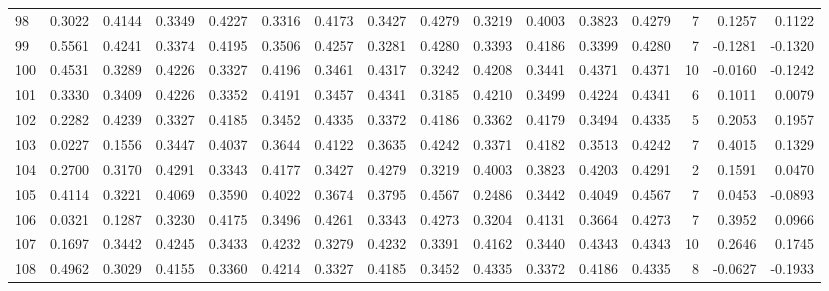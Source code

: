 \begin{tabular}{lrrrrrrrrrrrrrrr}
98  &      0.3022 &  0.4144 &  0.3349 &  0.4227 &  0.3316 &  0.4173 &  0.3427 &  0.4279 &  0.3219 &  0.4003 &   0.3823 &     0.4279 &      7 &                    0.1257 &                     0.1122 \\
99  &      0.5561 &  0.4241 &  0.3374 &  0.4195 &  0.3506 &  0.4257 &  0.3281 &  0.4280 &  0.3393 &  0.4186 &   0.3399 &     0.4280 &      7 &                   -0.1281 &                    -0.1320 \\
100 &      0.4531 &  0.3289 &  0.4226 &  0.3327 &  0.4196 &  0.3461 &  0.4317 &  0.3242 &  0.4208 &  0.3441 &   0.4371 &     0.4371 &     10 &                   -0.0160 &                    -0.1242 \\
101 &      0.3330 &  0.3409 &  0.4226 &  0.3352 &  0.4191 &  0.3457 &  0.4341 &  0.3185 &  0.4210 &  0.3499 &   0.4224 &     0.4341 &      6 &                    0.1011 &                     0.0079 \\
102 &      0.2282 &  0.4239 &  0.3327 &  0.4185 &  0.3452 &  0.4335 &  0.3372 &  0.4186 &  0.3362 &  0.4179 &   0.3494 &     0.4335 &      5 &                    0.2053 &                     0.1957 \\
103 &      0.0227 &  0.1556 &  0.3447 &  0.4037 &  0.3644 &  0.4122 &  0.3635 &  0.4242 &  0.3371 &  0.4182 &   0.3513 &     0.4242 &      7 &                    0.4015 &                     0.1329 \\
104 &      0.2700 &  0.3170 &  0.4291 &  0.3343 &  0.4177 &  0.3427 &  0.4279 &  0.3219 &  0.4003 &  0.3823 &   0.4203 &     0.4291 &      2 &                    0.1591 &                     0.0470 \\
105 &      0.4114 &  0.3221 &  0.4069 &  0.3590 &  0.4022 &  0.3674 &  0.3795 &  0.4567 &  0.2486 &  0.3442 &   0.4049 &     0.4567 &      7 &                    0.0453 &                    -0.0893 \\
106 &      0.0321 &  0.1287 &  0.3230 &  0.4175 &  0.3496 &  0.4261 &  0.3343 &  0.4273 &  0.3204 &  0.4131 &   0.3664 &     0.4273 &      7 &                    0.3952 &                     0.0966 \\
107 &      0.1697 &  0.3442 &  0.4245 &  0.3433 &  0.4232 &  0.3279 &  0.4232 &  0.3391 &  0.4162 &  0.3440 &   0.4343 &     0.4343 &     10 &                    0.2646 &                     0.1745 \\
108 &      0.4962 &  0.3029 &  0.4155 &  0.3360 &  0.4214 &  0.3327 &  0.4185 &  0.3452 &  0.4335 &  0.3372 &   0.4186 &     0.4335 &      8 &                   -0.0627 &                    -0.1933 \\

\end{tabular}
